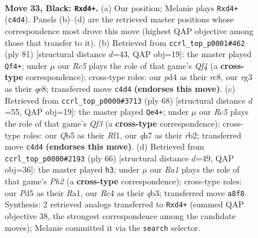 \documentclass[11pt]{article}
\begin{document}
\clearpage

\begin{figure}[p]\centering
\begin{subfigure}{0.46\textwidth}\centering
\resizebox{\linewidth}{!}{%
\newchessgame
\chessboard[
  setfen={r7/p6Q/2k1p3/pq1p4/2rP2P1/2b3R1/2P5/3K4 b - - 8 33},
  showmover=false,
  pgfstyle=straightmove, color=movearrow, markmove={c4-d4}
]}
\caption{}
\end{subfigure}\hfill
\begin{subfigure}{0.46\textwidth}\centering
\resizebox{\linewidth}{!}{%
\newchessgame
\chessboard[
  setfen={2R1Q3/p5pk/1p3r1p/5q1P/4p3/P7/1P4PK/8 b - - 3 41},
  showmover=false,
  pgfstyle=straightmove, color=movearrow, markmove={f5-f4}
]}
\caption{}
\end{subfigure}
\\[4pt]
\begin{subfigure}{0.46\textwidth}\centering
\resizebox{\linewidth}{!}{%
\newchessgame
\chessboard[
  setfen={8/B1p1bppk/p7/q3P2p/5P2/5Q1P/1r4P1/5RK1 w - - 0 35},
  showmover=false,
  pgfstyle=straightmove, color=movearrow, markmove={f3-e4}
]}
\caption{}
\end{subfigure}\hfill
\begin{subfigure}{0.46\textwidth}\centering
\resizebox{\linewidth}{!}{%
\newchessgame
\chessboard[
  setfen={3r3k/7p/1p3pp1/p7/P7/1qP3P1/5P1P/R3Q1K1 w - - 0 34},
  showmover=false,
  pgfstyle=straightmove, color=movearrow, markmove={h2-h3}
]}
\caption{}
\end{subfigure}
\caption{\textbf{Move 33, Black: \texttt{Rxd4+}.} (a) Our position; Melanie plays \texttt{Rxd4+} (\texttt{c4d4}). Panels (b)--(d) are the retrieved master positions whose correspondence most drove this move (highest QAP objective among those that transfer to it). (b) Retrieved from \texttt{ccrl\_top\_p0001\#462} (ply 81) [structural distance $d$=43, QAP obj=19]: the master played \texttt{Qf4+}; under $\mu$ our \emph{Rc5} plays the role of that game's \emph{Qf4} (a \textbf{cross-type} correspondence); cross-type roles: our \emph{p}d4 as their \emph{r}c8, our \emph{r}g3 as their \emph{q}e8; transferred move \texttt{c4d4} \textbf{(endorses this move)}. (c) Retrieved from \texttt{ccrl\_top\_p0000\#3713} (ply 68) [structural distance $d$=55, QAP obj=19]: the master played \texttt{Qe4+}; under $\mu$ our \emph{Rc5} plays the role of that game's \emph{Qf3} (a \textbf{cross-type} correspondence); cross-type roles: our \emph{Q}b5 as their \emph{R}f1, our \emph{q}h7 as their \emph{r}b2; transferred move \texttt{c4d4} \textbf{(endorses this move)}. (d) Retrieved from \texttt{ccrl\_top\_p0000\#2193} (ply 66) [structural distance $d$=49, QAP obj=36]: the master played \texttt{h3}; under $\mu$ our \emph{Ra1} plays the role of that game's \emph{Ph2} (a \textbf{cross-type} correspondence); cross-type roles: our \emph{P}d5 as their \emph{R}a1, our \emph{R}c4 as their \emph{q}b3; transferred move \texttt{a8f8}. Synthesis: 2 retrieved analogs transferred to \texttt{Rxd4+} (summed QAP objective 38, the strongest correspondence among the candidate moves); Melanie committed it via the \texttt{search} selector.}
\label{fig:thought-m65}
\end{figure}
\end{document}
